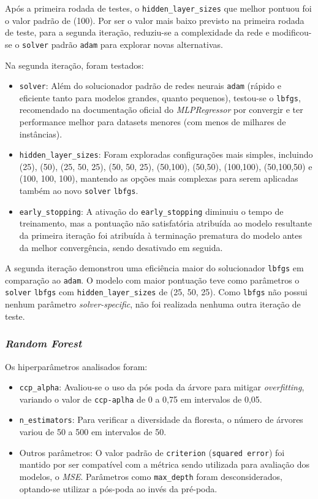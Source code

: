 \documentclass{report}
\begin{document}
Após a primeira rodada de testes, o \texttt{hidden\_layer\_sizes} que melhor pontuou foi o valor padrão de (100). Por ser o valor mais baixo previsto na primeira rodada de teste, para a segunda iteração, reduziu-se a complexidade da rede e modificou-se o \texttt{solver} padrão \texttt{adam} para explorar novas alternativas.

Na segunda iteração, foram testados:

\begin{itemize}
    \item \texttt{solver}:
    Além do solucionador padrão de redes neurais \texttt{adam} (rápido e eficiente tanto para modelos grandes, quanto pequenos), testou-se o \texttt{lbfgs}, recomendado na documentação oficial do \textit{MLPRegressor} \cite{MLPR} por convergir e ter performance melhor para datasets menores (com menos de milhares de instâncias).
    \item \texttt{hidden\_layer\_sizes}:
    Foram exploradas configurações mais simples, incluindo (25), (50), (25, 50, 25),
    (50, 50, 25), (50,100), (50,50), (100,100), (50,100,50) e (100, 100, 100), mantendo as opções mais complexas para serem aplicadas também ao novo \texttt{solver} \texttt{lbfgs}.
    \item \texttt{early\_stopping}:
    A ativação do \texttt{early\_stopping} diminuiu o tempo de treinamento, mas a pontuação não satisfatória atribuída ao modelo resultante da primeira iteração foi atribuída à terminação prematura do modelo antes da melhor convergência, sendo desativado em seguida.
\end{itemize}

A segunda iteração demonstrou uma eficiência maior do solucionador \texttt{lbfgs} em comparação ao \texttt{adam}. O modelo com maior pontuação teve como parâmetros o \texttt{solver} \texttt{lbfgs} com \texttt{hidden\_layer\_sizes} de (25, 50, 25). Como \texttt{lbfgs} não possui nenhum parâmetro \textit{solver-specific}, não foi realizada nenhuma outra iteração de teste.

\subsubsection{\textit{Random Forest}}
Os hiperparâmetros analisados foram:
\begin{itemize}
    \item \texttt{ccp\_alpha}:
    Avaliou-se o uso da pós poda da árvore para mitigar \textit{overfitting}, variando o valor de \texttt{ccp-aplha} de 0 a 0,75 em intervalos de 0,05. 
    \item \texttt{n\_estimators}:
    Para verificar a diversidade da floresta, o número de árvores variou de 50 a 500 em intervalos de 50.
    \item Outros parâmetros:
    O valor padrão de \texttt{criterion} (\texttt{squared error}) foi mantido por ser compatível com a métrica sendo utilizada para avaliação dos modelos, o \textit{MSE}. Parâmetros como \texttt{max\_depth} foram desconsiderados, optando-se utilizar a pós-poda ao invés da pré-poda.
\end{itemize}
\end{document}
